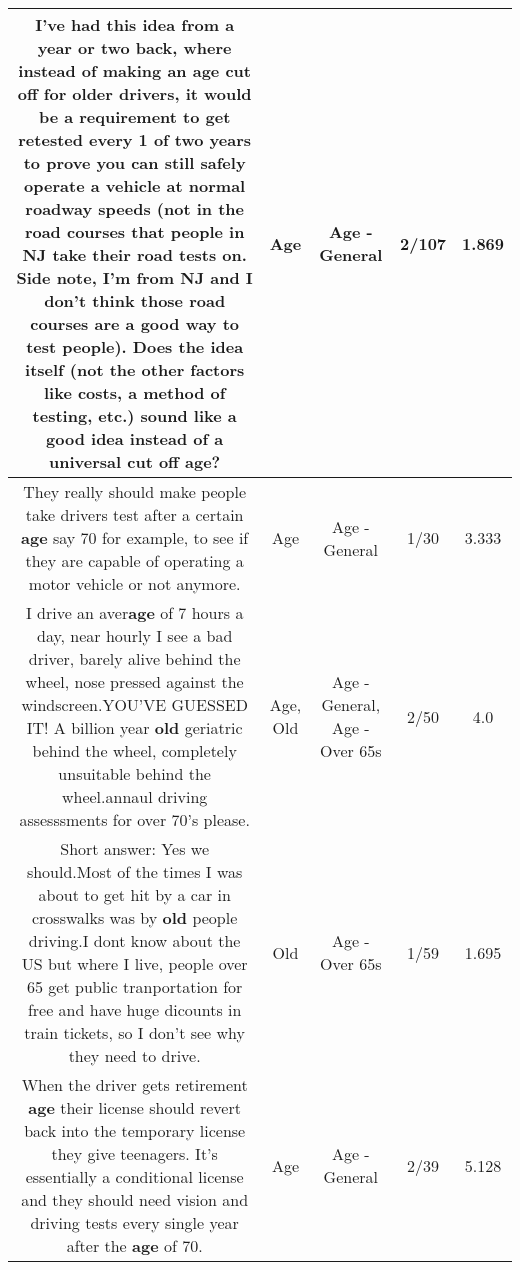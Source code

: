 \documentclass[11pt]{article}
\newlength\mylength
\begin{document}
\begin{center}
\begin{longtable}{|C{.65\mylength}|C{.30\mylength}|C{.12\mylength}|C{.12\mylength}|C{.12\mylength}|}
  \small I've had this idea from a year or two back, where instead of making an \textbf{age} cut off for older drivers, it would be a requirement to get retested every 1 of two years to prove you can still safely operate a vehicle at normal roadway speeds (not in the road courses that people in NJ take their road tests on. Side note, I'm from NJ and I don't think those road courses are a good way to test people). Does the idea itself (not the other factors like costs, a method of testing, etc.) sound like a good idea instead of a universal cut off \textbf{age}?\normalsize   & Age & Age - General & 2/107 & 1.869 \\  \hline
  \small They really should make people take drivers test after a certain \textbf{age} say 70 for example, to see if they are capable of operating a motor vehicle or not anymore.\normalsize   & Age & Age - General & 1/30 & 3.333 \\  \hline
  \small I drive an aver\textbf{age} of 7 hours a day, near hourly I see a bad driver, barely alive behind the wheel, nose pressed against the windscreen.YOU'VE GUESSED IT! A billion year \textbf{old} geriatric behind the wheel, completely unsuitable behind the wheel.annaul driving assesssments for over 70's please.\normalsize   & Age, Old & Age - General, Age - Over 65s & 2/50 & 4.0 \\  \hline
  \small Short answer: Yes we should.Most of the times I was about to get hit by a car in crosswalks was by \textbf{old} people driving.I dont know about the US but where I live, people over 65 get public tranportation for free and have huge dicounts in train tickets, so I don't see why they need to drive.\normalsize   & Old & Age - Over 65s & 1/59 & 1.695 \\  \hline
  \small When the driver gets retirement \textbf{age} their license should revert back into the temporary license they give teenagers. It's essentially a conditional license and they should need vision and driving tests every single year after the \textbf{age} of 70.\normalsize   & Age & Age - General & 2/39 & 5.128 \\  \hline

\end{longtable}
\end{center}
\end{document}
